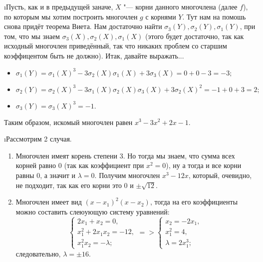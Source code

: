 \i Пусть, как и в предыдущей заначе, $X$ "--- корни данного многочлена (далее $f$), по которым мы хотим построить многочлен $g$ с корнями $Y$. Тут нам на помошь снова придёт теорема Виета. Нам достаточно найти $\sigma_3(Y), \sigma_2(Y), \sigma_1(Y)$, при том, что мы знаем $\sigma_3(X), \sigma_2(X), \sigma_1(X)$ (этого будет достаточно, так как исходный многочлен приведённый, так что никаких проблем со старшим коэффицентом быть не должно). Итак, давайте выражать...
\begin{itemize}
    \item $\sigma_1(Y) = \sigma_1(X)^3 - 3\sigma_2(X)\sigma_1(X) + 3\sigma_3(X) = 0 + 0 - 3 = -3;$
    \item $\sigma_2(Y) = \sigma_2(X)^3 - 3\sigma_1(X)\sigma_2(X)\sigma_3(X) + 3\sigma_2(X)^2 = -1 + 0 + 3 = 2;$
    \item $\sigma_3(Y) = \sigma_3(X)^3 = -1.$
\end{itemize}
Таким образом, искомый многочлен равен $x^3 - 3x^2 + 2x - 1$.

\i Рассмотрим 2 случая.
\begin{enumerate}
    \item Многочлен имеят корень степени 3. Но тогда мы знаем, что сумма всех корней равно 0 (так как коэффициент при $x^2 = 0$), ну а тогда и все корни равны 0, а значит и $\lambda = 0$. Получим многочлен $x^3 - 12x$, который, очевидно, не подходит, так как его корни это $0$ и $\pm\sqrt{12}$.
    \item Многочлен имеет вид $(x-x_1)^2(x-x_2)$, тогда на его коэффициенты можно составить слеюующую систему уравнений:
    $$\begin{cases}
        2x_1 + x_2 = 0,\\
        x_1^2 + 2x_1x_2 = -12,\\
        x_1^2x_2 = -\lambda;
    \end{cases} => \begin{cases}
        x_2 = -2x_1,\\
        x_1^2 = 4,\\
        \lambda = 2x_1^3;
    \end{cases}$$
    следовательно, $\lambda = \pm16$.
\end{enumerate}


